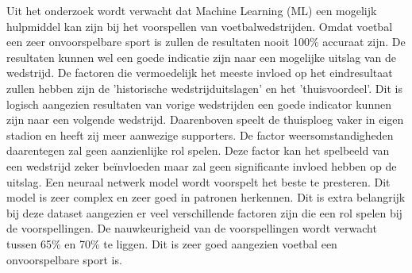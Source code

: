 Uit het onderzoek wordt verwacht dat Machine Learning (ML) een mogelijk hulpmiddel kan zijn bij het voorspellen van voetbalwedstrijden. Omdat voetbal een zeer onvoorspelbare sport is zullen de resultaten nooit 100\% accuraat zijn. De resultaten kunnen wel een goede indicatie zijn naar een mogelijke uitslag van de wedstrijd.
De factoren die vermoedelijk het meeste invloed op het eindresultaat zullen hebben zijn de 'historische wedstrijduitslagen' en het 'thuisvoordeel'. Dit is logisch aangezien resultaten van vorige wedstrijden een goede indicator kunnen zijn naar een volgende wedstrijd. Daarenboven speelt de thuisploeg vaker in eigen stadion en heeft zij meer aanwezige supporters.
De factor weersomstandigheden daarentegen zal geen aanzienlijke rol spelen. Deze factor kan het spelbeeld van een wedstrijd zeker beïnvloeden maar zal geen significante invloed hebben op de uitslag.
Een neuraal netwerk model wordt voorspelt het beste te presteren. Dit model is zeer complex en zeer goed in patronen herkennen. Dit is extra belangrijk bij deze dataset aangezien er veel verschillende factoren zijn die een rol spelen bij de voorspellingen.
De nauwkeurigheid van de voorspellingen wordt verwacht tussen 65\% en 70\% te liggen. Dit is zeer goed aangezien voetbal een onvoorspelbare sport is. 
